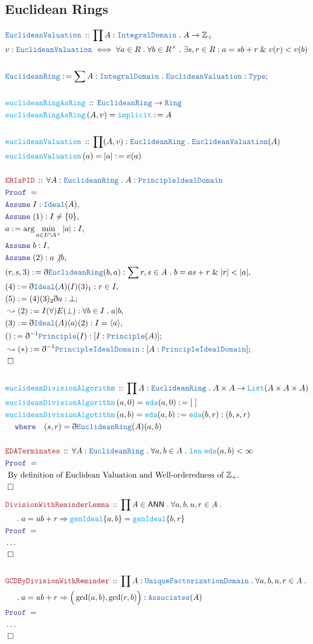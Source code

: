 \documentclass[12pt]{scrartcl}
\newcommand{\TYPE}[1]{\textcolor{NavyBlue}{\mathtt{#1}}}
\newcommand{\FUNC}[1]{\textcolor{Cerulean}{\mathtt{#1}}}
\newcommand{\LOGIC}[1]{\textcolor{Blue}{\mathtt{#1}}}
\newcommand{\THM}[1]{\textcolor{Maroon}{\mathtt{#1}}}
\renewcommand{\.}{\; . \;}
\newcommand{\de}{: \kern 0.1pc =}
\newcommand{\where}{\LOGIC{where}}
\newcommand{\Act}[1]{\left( #1 \right)}
\newcommand{\Theorem}[2]{& \THM{#1} \, :: \, #2 \\ & \Proof = \\ }
\newcommand{\DeclareType}[2]{& \TYPE{#1} \, :: \, #2 \\}
\newcommand{\DefineType}[3]{& #1 : \TYPE{#2} \iff #3 \\}
\newcommand{\DeclareFunc}[2]{& \FUNC{#1} \, :: \, #2 \\}
\newcommand{\DefineNamedFunc}[4]{&  \FUNC{#1}\Act{#2} = #3 \de #4 \\}
\newcommand{\NewLine}{\\ & \kern 1pc}
\newcommand{\Page}[1]{ \begin{align*} #1 \end{align*}   }
\newcommand{ \bd }{ \ByDef }
\newcommand{\NoProof}{ & \ldots \\ \EndProof}
\renewcommand{\And}{\; \& \;}
\newcommand{\Type}{\TYPE{Type}}
\newcommand{\Int}{\mathbb{Z} }
\newcommand{\Say}[3]{& #1 \de #2 : #3, \\}
\newcommand{\Conclude}[3]{& #1 \de #2 : #3; \\}
\newcommand{\Derive}[3]{& \leadsto #1 \de #2 : #3, \\}
\newcommand{\DeriveConclude}[3]{& \leadsto #1 \de #2 : #3 ; \\}
\newcommand{\Assume}[2]{& \LOGIC{Assume} \; #1 : #2, \\}
\newcommand{\QED}{\; \square}
\newcommand{\EndProof}{& \QED \\}
\newcommand{\ByDef}{\eth}
\newcommand{\Proof}{\LOGIC{Proof} \; }
\newcommand{\Ring}{\TYPE{Ring}}
\newcommand{\Ideal}{\TYPE{Ideal}}
\newcommand{\ID}{\TYPE{IntegralDomain}}
\newcommand{\UFD}{\TYPE{UniqueFactorizationDomain}}
\newcommand{\PID}{\TYPE{PrincipleIdealDomain}}
\newcommand{\ER}{\TYPE{EuclideanRing}}
\newcommand{\ANN}{\mathsf{ANN}}
\begin{document}
\subsection{Euclidean Rings}
\Page{
	\DeclareType{EuclideanValuation}{\prod A : \ID \. A \to \Int_+}
	\DefineType{v}{EuclideanValuation}{\forall a \in R \. \forall b \in R^\times \. \exists s,r \in R :  a = sb + r \And v(r) < v(b)} 
	\\
	\Conclude{\ER}{ \sum  A : \ID \. \TYPE{EuclideanValuation}}{\Type}
	\\
	\DeclareFunc{euclideanRingAsRing}{ \ER \to \Ring }
	\DefineNamedFunc{euclideanRingAsRing}{A,v}{\FUNC{implicit}}{A}
	\\
	\DeclareFunc{euclideanValuation}{ \prod (A,v) : \ER \. \TYPE{EuclideanValuation}(A)}
	\DefineNamedFunc{euclideanValuation}{a}{|a|}{v(a)}
	\\
	\Theorem{ERIsPID}{\forall A : \ER \. A : \PID}
	\Assume{I}{\Ideal(A)}
	\Assume{(1)}{I \neq \{ 0 \}}
	\Say{a}{\arg \min_{a \in I \cap A^\times} |a|}{I}
	\Assume{b}{I}
	\Assume{(2)}{ a \not | b}
	\Say{(r,s,3)}{ \bd \ER(b,a)  }{ \sum r,s \in A \. b = as + r \And |r| < |a|  }
	\Say{(4)}{\bd \Ideal(A)(I)(3)_1}{ r \in I}
	\Conclude{(5)}{ (4)(3)_2\bd a }{  \bot   }
	\Derive{(2)}{I(\forall)E(\bot)}{ \forall b \in I \.  a | b}
	\Say{(3)}{\bd \Ideal(A)\langle a \rangle(2)}{ I = \langle a \rangle}
	\Conclude{()}{\bd^{-1} \TYPE{Principle}(I) }{ [I : \TYPE{Principle}(A)]}
	\DeriveConclude{(*)}{\bd^{-1}\PID}{[A : \PID]}
	\EndProof
	\\
	\DeclareFunc{euclideanDivisionAlgorithm}{\prod A : \ER \. A \times A \to \FUNC{List}(A \times A \times A)}
	\DefineNamedFunc{euclideanDivisionAlgorithm}{ a,0 }{ \FUNC{eda}(a,0)}{[\;]}
	\DefineNamedFunc{euclideanDivisionAlgotithm}{a,b}{\FUNC{eda}(a,b)}{  \FUNC{eda}(b,r) : (b,s,r)  \NewLine \where \quad (s,r) = \bd \ER(A)(a,b) } 
	\\
	\Theorem{EDATerminates}{ \forall A : \ER \. \forall a,b \in A \. \FUNC{len} \; \FUNC{eda}(a,b) < \infty  }
	&  \text{ By definition of Euclidean Valuation and Well-orderedness of $\Int_+$. }  \\
	\EndProof
}\Page{
	\Theorem{DivisionWithReminderLemma}{ \prod  A \in \ANN \. \forall a,b,u,r \in A \.  \NewLine \. a = ub + r \Rightarrow \FUNC{genIdeal}\{a,b\} = \FUNC{genIdeal}\{b,r\}  }
	\NoProof
	\\
	\Theorem{GCDByDivisionWithReminder}{ \prod A : \UFD \. \forall a,b,u,r \in A \. \NewLine \.  a = ub + r \Rightarrow \Big( \gcd(a,b) , \gcd(r,b) \Big) : \TYPE{Associates}(A)  }
	\NoProof
}
\end{document}
